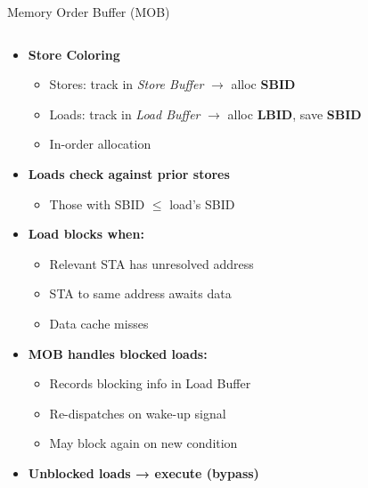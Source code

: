 \documentclass[aspectratio=169,12pt]{beamer}
\begin{document}
\begin{frame}{Memory Order Buffer (MOB)}
  \begin{columns}
    \begin{column}{0.7\textwidth}
      \begin{itemize}
        \item \textbf{Store Coloring}
        \begin{itemize}
          \item Stores: track in \emph{Store Buffer} $\rightarrow$ alloc \textbf{SBID}
          \item Loads: track in \emph{Load Buffer} $\rightarrow$ alloc \textbf{LBID}, save \textbf{SBID}
          \item In-order allocation
        \end{itemize}
        
        \item \textbf{Loads check against prior stores}
        \begin{itemize}
          \item Those with SBID $\leq$ load's SBID
        \end{itemize}
        
        \item \textbf{Load blocks when:}
        \begin{itemize}
          \item Relevant STA has unresolved address
          \item STA to same address awaits data
          \item Data cache misses
        \end{itemize}
        
        \item \textbf{MOB handles blocked loads:}
        \begin{itemize}
          \item Records blocking info in Load Buffer
          \item Re-dispatches on wake-up signal
          \item May block again on new condition
        \end{itemize}
        
        \item \textbf{Unblocked loads → execute (bypass)}
      \end{itemize}
    \end{column}
    

\end{columns}
\end{frame}
\end{document}
